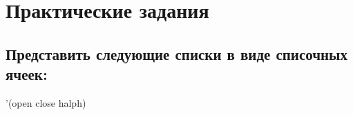 \chapter{Практические задания}
\section{Представить следующие списки в виде списочных ячеек:}

'(open close halph)
\begin{figure}[H]
\end{figure} 

